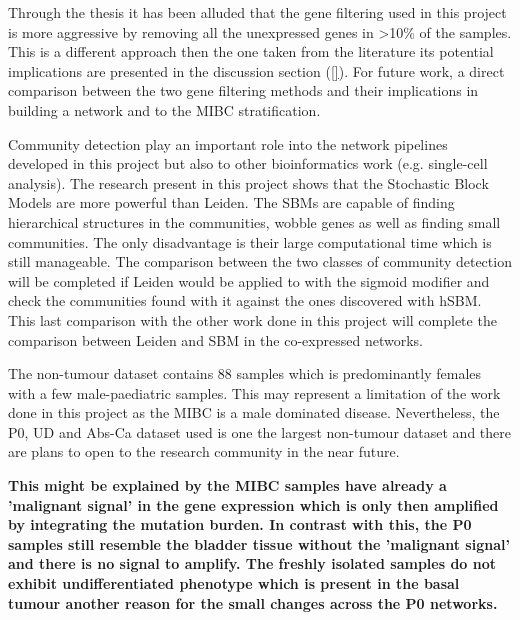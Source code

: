 Through the thesis it has been alluded that the gene filtering used in this project is more aggressive by removing all the unexpressed genes in >10\% of the samples. This is a different approach then the one taken from the literature its potential implications are presented in the discussion section (\ref{}). For future work, a direct comparison between the two gene filtering methods and their implications in building a network and to the MIBC stratification.

Community detection play an important role into the network pipelines developed in this project but also to other bioinformatics work (e.g. single-cell analysis). The research present in this project shows that the Stochastic Block Models are more powerful than Leiden. The SBMs are capable of finding hierarchical structures in the communities, wobble genes as well as finding small communities. The only disadvantage is their large computational time which is still manageable. The comparison between the two classes of community detection will be completed if Leiden would be applied to with the sigmoid modifier and check the communities found with it against the ones discovered with hSBM. This last comparison with the other work done in this project will complete the comparison between Leiden and SBM in the co-expressed networks.

The non-tumour dataset contains 88 samples which is predominantly females with a few male-paediatric samples. This may represent a limitation of the work done in this project as the MIBC is a male dominated disease. Nevertheless, the P0, UD and Abs-Ca dataset used is one the largest non-tumour dataset and there are plans to open to the research community in the near future.


\textbf{This might be explained by the MIBC samples have already a 'malignant signal' in the gene expression which is only then amplified by integrating the mutation burden. In contrast with this, the P0 samples still resemble the bladder tissue without the 'malignant signal' and there is no signal to amplify. The freshly isolated samples do not exhibit undifferentiated phenotype which is present in the basal tumour another reason for the small changes across the P0 networks.}

